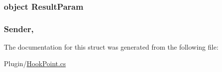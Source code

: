 \subsubsection[{Result\+Param}]{\setlength{\rightskip}{0pt plus 5cm}object Result\+Param\hspace{0.3cm}{\ttfamily [get]}}\label{structOTA_1_1Plugin_1_1HookContext_af454c4dfe355a944d59be5d8dbd0c37e}
\hypertarget{structOTA_1_1Plugin_1_1HookContext_a2d48f7bafa003ef64f1e835c1d91a655}{}
\subsubsection[{Sender}]{ {\bf Sender}\hspace{0.3cm}{\ttfamily [get]}, {\ttfamily [set]}}\label{structOTA_1_1Plugin_1_1HookContext_a2d48f7bafa003ef64f1e835c1d91a655}


The documentation for this struct was generated from the following file\+:\begin{DoxyCompactItemize}
\item 
Plugin/\hyperlink{HookPoint_8cs}{Hook\+Point.\+cs}\end{DoxyCompactItemize}

